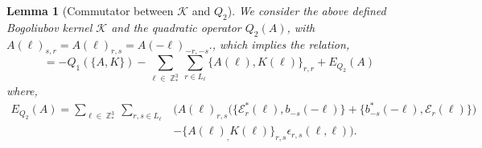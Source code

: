 \documentclass[sn-mathphys, Numbered ,a4paper]{sn-jnl}%
\DeclareMathOperator{\Z}{\mathbb{Z}}
\theoremstyle{plain}
\newtheorem{lemma}[theorem]{Lemma}
\theoremstyle{definition}
\theoremstyle{remark}
\theoremstyle{plain}
\theoremstyle{definition}
\theoremstyle{remark}
\begin{document}
\begin{lemma}[Commutator between $\mathcal{K} $ and $Q_2$]\label{lem:Q2Kcomm}
We consider the above defined Bogoliubov kernel $\mathcal{K}$ and the quadratic operator $Q_2(A)$, with $A(\ell)_{s,r} = A(\ell)_{r,s} = A(-\ell)_{-r,-s}.$, which implies the relation,
\begin{equation}
    [ Q_2(A),\mathcal{K}] = -Q_1\left(\big\{A
        ,K\big\}\right)-\sum\limits_{\ell \in \Z^3_*}\sum\limits_{r \in L_{\ell}}\big\{A(\ell)
        ,K(\ell)\big\}_{r,r} + E_{Q_2}(A) 
\end{equation}
 where,
\begin{align}
    E_{Q_2}(A) =
        \sum\limits_{\ell \in \Z^3_*}\sum\limits_{r,s \in L_{\ell}}&\Big(A(\ell)_{r,s}\big(\big\{\mathcal{E}^*_{r}(\ell), b_{-s}(-\ell)\big\} + \big\{ b^*_{-s}(-\ell) , \mathcal{E}_r(\ell) \big\} \big)\nonumber\\&-\big\{A(\ell)_,K(\ell)\big\}_{r,s}\epsilon_{r,s}(\ell,\ell)\Big)\label{eq:errKQ2} . 
\end{align}
\end{lemma}
\end{document}
